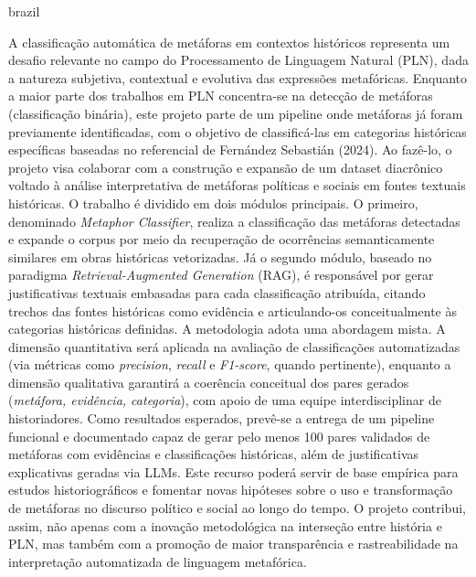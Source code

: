 \cleardoublepage{}
{}
\begin{otherlanguage*}{brazil}
\begin{resumo}[Resumo]
    A classificação automática de metáforas em contextos históricos representa um desafio relevante no campo do Processamento de Linguagem Natural (PLN), dada a natureza subjetiva, contextual e evolutiva das expressões metafóricas. Enquanto a maior parte dos trabalhos em PLN concentra-se na detecção de metáforas (classificação binária), este projeto parte de um pipeline onde metáforas já foram previamente identificadas, com o objetivo de classificá-las em categorias históricas específicas baseadas no referencial de Fernández Sebastián (2024). Ao fazê-lo, o projeto visa colaborar com a construção e expansão de um dataset diacrônico voltado à análise interpretativa de metáforas políticas e sociais em fontes textuais históricas. O trabalho é dividido em dois módulos principais. O primeiro, denominado \textit{Metaphor Classifier}, realiza a classificação das metáforas detectadas e expande o corpus por meio da recuperação de ocorrências semanticamente similares em obras históricas vetorizadas. Já o segundo módulo, baseado no paradigma \textit{Retrieval-Augmented Generation} (RAG), é responsável por gerar justificativas textuais embasadas para cada classificação atribuída, citando trechos das fontes históricas como evidência e articulando-os conceitualmente às categorias históricas definidas. A metodologia adota uma abordagem mista. A dimensão quantitativa será aplicada na avaliação de classificações automatizadas (via métricas como \textit{precision}, \textit{recall} e \textit{F1-score}, quando pertinente), enquanto a dimensão qualitativa garantirá a coerência conceitual dos pares gerados (\textit{metáfora, evidência, categoria}), com apoio de uma equipe interdisciplinar de historiadores. Como resultados esperados, prevê-se a entrega de um pipeline funcional e documentado capaz de gerar pelo menos 100 pares validados de metáforas com evidências e classificações históricas, além de justificativas explicativas geradas via LLMs. Este recurso poderá servir de base empírica para estudos historiográficos e fomentar novas hipóteses sobre o uso e transformação de metáforas no discurso político e social ao longo do tempo. O projeto contribui, assim, não apenas com a inovação metodológica na interseção entre história e PLN, mas também com a promoção de maior transparência e rastreabilidade na interpretação automatizada de linguagem metafórica.

\end{resumo}
\end{otherlanguage*}

